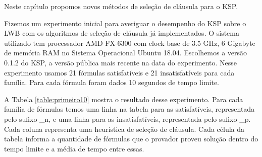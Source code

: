 Neste capítulo propomos novos métodos de seleção de cláusula para o KSP.

Fizemos um experimento inicial para averiguar o desempenho do KSP sobre o LWB com os algoritmos de seleção de cláusula já implementados. O sistema utilizado tem processador AMD FX-6300 com clock base de 3.5 GHz, 6 Gigabyte de memória RAM no Sistema Operacional Ubuntu 18.04. Escolhemos a versão 0.1.2 do KSP, a versão pública mais recente na data do experimento. Nesse experimento usamos 21 fórmulas satisfatíveis e 21 insatisfatíveis para cada família. Para cada fórmula foram dados 10 segundos de tempo limite.

A Tabela \ref{table:primeiro10} mostra o resultado desse experimento. Para cada família de fórmulas temos uma linha na tabela para as satisfatíveis, representada pelo sufixo \_n, e uma linha para as insatisfatíveis, representada pelo sufixo \_p. Cada coluna representa uma heurística de seleção de cláusula. Cada célula da tabela informa a quantidade de fórmulas que o provador proveu solução dentro do tempo limite e a média de tempo entre essas.

